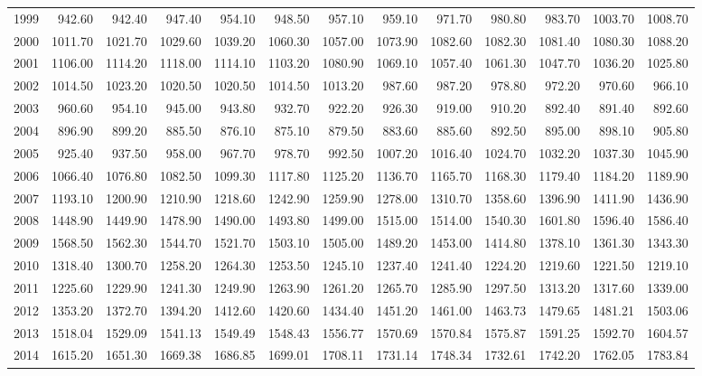 \begin{longtable}{rrrrrrrrrrrrr}
  1999 & 942.60 & 942.40 & 947.40 & 954.10 & 948.50 & 957.10 & 959.10 & 971.70 & 980.80 & 983.70 & 1003.70 & 1008.70 \\ 
  2000 & 1011.70 & 1021.70 & 1029.60 & 1039.20 & 1060.30 & 1057.00 & 1073.90 & 1082.60 & 1082.30 & 1081.40 & 1080.30 & 1088.20 \\ 
  2001 & 1106.00 & 1114.20 & 1118.00 & 1114.10 & 1103.20 & 1080.90 & 1069.10 & 1057.40 & 1061.30 & 1047.70 & 1036.20 & 1025.80 \\ 
  2002 & 1014.50 & 1023.20 & 1020.50 & 1020.50 & 1014.50 & 1013.20 & 987.60 & 987.20 & 978.80 & 972.20 & 970.60 & 966.10 \\ 
  2003 & 960.60 & 954.10 & 945.00 & 943.80 & 932.70 & 922.20 & 926.30 & 919.00 & 910.20 & 892.40 & 891.40 & 892.60 \\ 
  2004 & 896.90 & 899.20 & 885.50 & 876.10 & 875.10 & 879.50 & 883.60 & 885.60 & 892.50 & 895.00 & 898.10 & 905.80 \\ 
  2005 & 925.40 & 937.50 & 958.00 & 967.70 & 978.70 & 992.50 & 1007.20 & 1016.40 & 1024.70 & 1032.20 & 1037.30 & 1045.90 \\ 
  2006 & 1066.40 & 1076.80 & 1082.50 & 1099.30 & 1117.80 & 1125.20 & 1136.70 & 1165.70 & 1168.30 & 1179.40 & 1184.20 & 1189.90 \\ 
  2007 & 1193.10 & 1200.90 & 1210.90 & 1218.60 & 1242.90 & 1259.90 & 1278.00 & 1310.70 & 1358.60 & 1396.90 & 1411.90 & 1436.90 \\ 
  2008 & 1448.90 & 1449.90 & 1478.90 & 1490.00 & 1493.80 & 1499.00 & 1515.00 & 1514.00 & 1540.30 & 1601.80 & 1596.40 & 1586.40 \\ 
  2009 & 1568.50 & 1562.30 & 1544.70 & 1521.70 & 1503.10 & 1505.00 & 1489.20 & 1453.00 & 1414.80 & 1378.10 & 1361.30 & 1343.30 \\ 
  2010 & 1318.40 & 1300.70 & 1258.20 & 1264.30 & 1253.50 & 1245.10 & 1237.40 & 1241.40 & 1224.20 & 1219.60 & 1221.50 & 1219.10 \\ 
  2011 & 1225.60 & 1229.90 & 1241.30 & 1249.90 & 1263.90 & 1261.20 & 1265.70 & 1285.90 & 1297.50 & 1313.20 & 1317.60 & 1339.00 \\ 
  2012 & 1353.20 & 1372.70 & 1394.20 & 1412.60 & 1420.60 & 1434.40 & 1451.20 & 1461.00 & 1463.73 & 1479.65 & 1481.21 & 1503.06 \\ 
  2013 & 1518.04 & 1529.09 & 1541.13 & 1549.49 & 1548.43 & 1556.77 & 1570.69 & 1570.84 & 1575.87 & 1591.25 & 1592.70 & 1604.57 \\ 
  2014 & 1615.20 & 1651.30 & 1669.38 & 1686.85 & 1699.01 & 1708.11 & 1731.14 & 1748.34 & 1732.61 & 1742.20 & 1762.05 & 1783.84 \\ 

\end{longtable}
